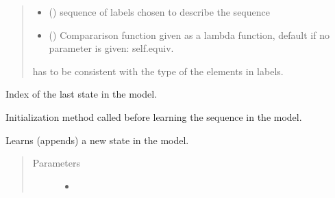 \documentclass[letterpaper,10pt,english]{sphinxmanual}
\begin{document}
\begin{fulllineitems}
\begin{fulllineitems}
\begin{quote}
\begin{description}
\begin{itemize}
\item {} 
 () \textendash{} sequence of labels chosen to describe the sequence

\item {} 
 () \textendash{} Compararison function given as a lambda function, default if no parameter is given: self.equiv.

\end{itemize}

\item[{!}] \leavevmode
{} has to be consistent with the type of the elements in labels.

\end{description}\end{quote}

\end{fulllineitems}


\begin{fulllineitems}
\label{\detokenize{index:Model.Model.index_last_state}}
Index of the last state in the model.

\end{fulllineitems}


\begin{fulllineitems}
\label{\detokenize{index:Model.Model.init_model}}
Initialization method called before learning the sequence in the model.

\end{fulllineitems}


\begin{fulllineitems}
\label{\detokenize{index:Model.Model.learn_event}}
Learns (appends) a new state in the model.
\begin{quote}\begin{description}
\item[{Parameters}] \leavevmode\begin{itemize}
\item {} 
 \textendash{} 


\end{itemize}
\end{description}
\end{quote}
\end{fulllineitems}
\end{fulllineitems}
\end{document}
